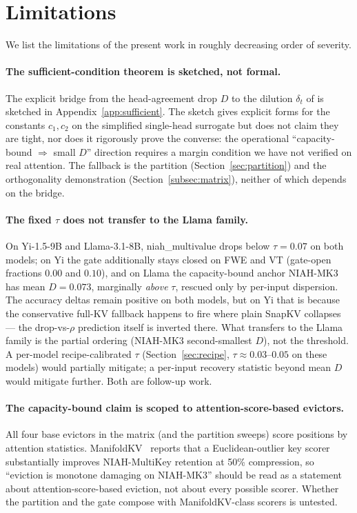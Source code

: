 \documentclass{article} %
\begin{document}
\section{Limitations}
\label{sec:limitations}

We list the limitations of the present work in roughly decreasing
order of severity.

\paragraph{The sufficient-condition theorem is sketched, not formal.}
The explicit bridge from the head-agreement drop $D$ to the dilution
$\delta_t$ of \citet{arxiv260509649} is sketched in Appendix~\ref{app:sufficient}. The sketch
gives explicit forms for the constants $c_1, c_2$ on the simplified
single-head surrogate but does not claim they are tight, nor does it
rigorously prove the converse: the operational ``capacity-bound
$\Rightarrow$ small $D$'' direction requires a margin condition we
have not verified on real attention. The fallback is the partition
(Section~\ref{sec:partition}) and the orthogonality demonstration
(Section~\ref{subsec:matrix}), neither of which depends on the bridge.

\paragraph{The fixed $\tau$ does not transfer to the Llama family.} On
Yi-1.5-9B and Llama-3.1-8B, niah\_multivalue drops below $\tau = 0.07$
on both models; on Yi the gate additionally stays closed on FWE and VT
(gate-open fractions $0.00$ and $0.10$), and on Llama the
capacity-bound anchor NIAH-MK3 has mean $D = 0.073$, marginally
\emph{above} $\tau$, rescued only by per-input dispersion. The
accuracy deltas remain positive on both models, but on Yi that is
because the conservative full-KV fallback happens to fire where plain
SnapKV collapses --- the drop-vs-$\rho$ prediction itself is inverted
there. What transfers to the Llama family is the partial ordering
(NIAH-MK3 second-smallest $D$), not the threshold. A per-model
recipe-calibrated $\tau$ (Section~\ref{sec:recipe}, $\tau \approx
0.03$--$0.05$ on these models) would partially mitigate; a per-input
recovery statistic beyond mean $D$ would mitigate further. Both are
follow-up work.

\paragraph{The capacity-bound claim is scoped to attention-score-based
evictors.} All four base evictors in the matrix (and the partition
sweeps) score positions by attention statistics.
ManifoldKV~\citep{arxiv260208343} reports that a Euclidean-outlier key
scorer substantially improves NIAH-MultiKey retention at 50\%
compression, so ``eviction is monotone damaging on NIAH-MK3'' should
be read as a statement about attention-score-based eviction, not about
every possible scorer. Whether the partition and the gate compose with
ManifoldKV-class scorers is untested.
\end{document}
